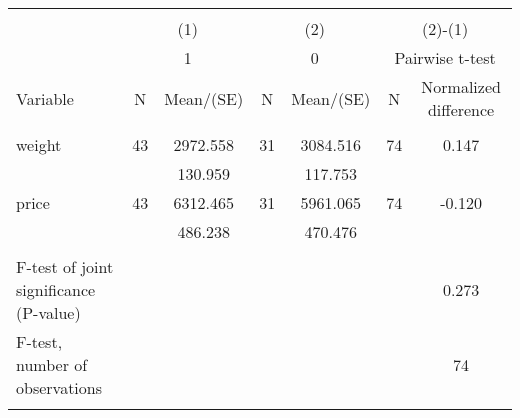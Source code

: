\begin{tabular}{@{\extracolsep{5pt}}lcccccc}
\\[-1.8ex]\hline \hline \\[-1.8ex]
 & \multicolumn{2}{c}{(1)}  & \multicolumn{2}{c}{(2)}  & \multicolumn{2}{c}{(2)-(1)} \\
 & \multicolumn{2}{c}{1}  & \multicolumn{2}{c}{0}  & \multicolumn{2}{c}{Pairwise t-test}  \\
Variable & N & Mean/(SE) & N & Mean/(SE) & N & Normalized difference \\ \hline \\[-1.8ex] 
weight   & 43    &  2972.558    & 31    &  3084.516    & 74    &     0.147   \\
 &   &   130.959  &   &   117.753  &   &   \\
price   & 43    &  6312.465    & 31    &  5961.065    & 74    &    -0.120   \\
 &   &   486.238  &   &   470.476  &   &   \\
\hline \\[-1.8ex]
F-test of joint significance (P-value) & &   & &     & &      0.273   \\
F-test, number of observations & &   & &   & &  74   \\
\hline \\[-1.8ex]

\end{tabular}
